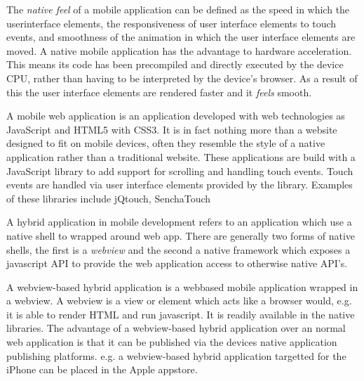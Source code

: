 
The \emph{native feel} of a mobile application can be defined as the speed in which the userinterface elements, the responsiveness of user interface elements to touch events, and smoothness of the animation in which the user interface elements are moved. A native mobile application has the advantage to hardware acceleration. This means its code has been precompiled and directly executed by the device CPU, rather than having to be interpreted by the device's browser. As a result of this the user interface elements are rendered faster and it \emph{feels} smooth.


A mobile web application is an application developed with web technologies as JavaScript and HTML5 with CSS3. It is in fact nothing more than a website designed to fit on mobile devices, often they resemble the style of a native application rather than a traditional website. These applications are build with a JavaScript library to add support for scrolling and handling touch events. Touch events are handled via user interface elements provided by the library. Examples of these libraries include jQtouch, SenchaTouch


A hybrid application in mobile development refers to an application which use a native shell to wrapped around web app. There are generally two forms of native shells, the first is a \emph{webview} and the second a native framework which exposes a javascript API to provide the web application access to otherwise native API's.

A webview-based hybrid application is a webbased mobile application wrapped in a webview. A webview is a view or element which acts like a browser would, e.g. it is able to render HTML and run javascript.  It is readily available in the native libraries. The advantage of a webview-based hybrid application over an normal web application is that it can be published via the devices native application publishing platforms. e.g. a webview-based hybrid application targetted for the iPhone can be placed in the Apple appstore. 

